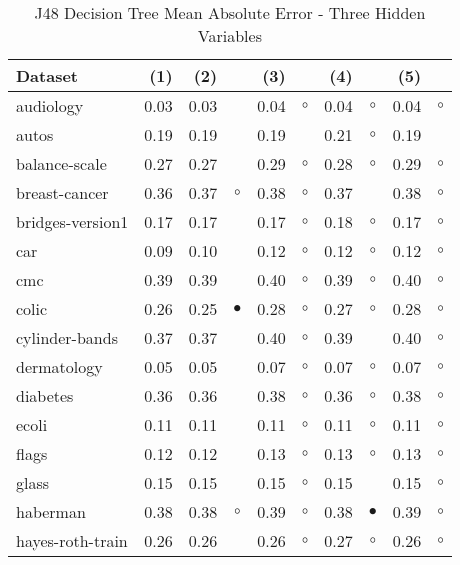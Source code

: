 \newpage
{\centering \footnotesize \begin{longtable}{lrr@{\hspace{0.1cm}}cr@{\hspace{0.1cm}}cr@{\hspace{0.1cm}}cr@{\hspace{0.1cm}}c}
\caption{\label{j48mae3}J48 Decision Tree Mean Absolute Error - Three Hidden Variables}
\\
\hline
Dataset & (1)& (2) & & (3) & & (4) & & (5) & \\
\hline
audiology & 0.03 & 0.03 &           & 0.04 &   $\circ$ & 0.04 &   $\circ$ & 0.04 &   $\circ$\\
autos & 0.19 & 0.19 &           & 0.19 &           & 0.21 &   $\circ$ & 0.19 &          \\
balance-scale & 0.27 & 0.27 &           & 0.29 &   $\circ$ & 0.28 &   $\circ$ & 0.29 &   $\circ$\\
breast-cancer & 0.36 & 0.37 &   $\circ$ & 0.38 &   $\circ$ & 0.37 &           & 0.38 &   $\circ$\\
bridges-version1 & 0.17 & 0.17 &           & 0.17 &   $\circ$ & 0.18 &   $\circ$ & 0.17 &   $\circ$\\
car & 0.09 & 0.10 &           & 0.12 &   $\circ$ & 0.12 &   $\circ$ & 0.12 &   $\circ$\\
cmc & 0.39 & 0.39 &           & 0.40 &   $\circ$ & 0.39 &   $\circ$ & 0.40 &   $\circ$\\
colic & 0.26 & 0.25 & $\bullet$ & 0.28 &   $\circ$ & 0.27 &   $\circ$ & 0.28 &   $\circ$\\
cylinder-bands & 0.37 & 0.37 &           & 0.40 &   $\circ$ & 0.39 &           & 0.40 &   $\circ$\\
dermatology & 0.05 & 0.05 &           & 0.07 &   $\circ$ & 0.07 &   $\circ$ & 0.07 &   $\circ$\\
diabetes & 0.36 & 0.36 &           & 0.38 &   $\circ$ & 0.36 &   $\circ$ & 0.38 &   $\circ$\\
ecoli & 0.11 & 0.11 &           & 0.11 &   $\circ$ & 0.11 &   $\circ$ & 0.11 &   $\circ$\\
flags & 0.12 & 0.12 &           & 0.13 &   $\circ$ & 0.13 &   $\circ$ & 0.13 &   $\circ$\\
glass & 0.15 & 0.15 &           & 0.15 &   $\circ$ & 0.15 &           & 0.15 &   $\circ$\\
haberman & 0.38 & 0.38 &   $\circ$ & 0.39 &   $\circ$ & 0.38 & $\bullet$ & 0.39 &   $\circ$\\
hayes-roth-train & 0.26 & 0.26 &           & 0.26 &   $\circ$ & 0.27 &   $\circ$ & 0.26 &   $\circ$\\

\end{longtable}}
